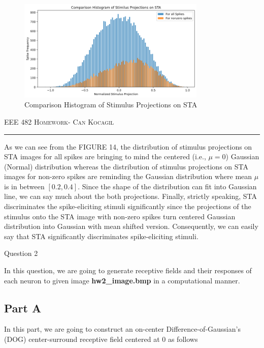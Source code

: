 \documentclass[12pt]{amsart}
\makeatletter
\def\section{\@startsection{section}{1}%
  \z@{.7\linespacing\@plus\linespacing}{.5\linespacing}%
  {\normalfont\scshape}}%
\makeatother
\begin{document}
\begin{figure}[h]
    \centering
    \includegraphics[width = 0.8\textwidth]{images/comparisonhist.png}
    \caption{Comparison Histogram of Stimulus Projections on STA}
\end{figure}



\newpage
{\scshape EEE 482} \hfill {\scshape \large  Homework-\relax} \hfill {\scshape Can Kocagil}
\smallskip
\hrule
\vspace{2mm}

As we can see from the FIGURE 14, the distribution of stimulus projections on STA images for all spikes are bringing to mind the centered (i.e., $\mu = 0$) Gaussian (Normal) distribution whereas the distribution of stimulus projections on STA images for non-zero spikes are reminding the  Gaussian distribution where mean $\mu$ is in between $[0.2,0.4]$. Since the shape of the distribution can fit into Gaussian line, we can say much about the both projections. Finally, strictly speaking, STA discriminates the spike-eliciting stimuli significantly since the projections of the stimulus onto the STA image with non-zero spikes turn centered Gaussian distribution into Gaussian with mean shifted version. Consequently, we can easily say that STA significantly discriminates spike-eliciting stimuli.


\section{Question 2}

In this question, we are going to generate receptive fields and their responses of each neuron to given image \textbf{hw2\_image.bmp} in a computational manner.


\subsection{Part A}
In this part, we are going to construct an on-center Difference-of-Gaussian's (DOG) center-surround receptive field centered at 0 as follows
\end{document}
